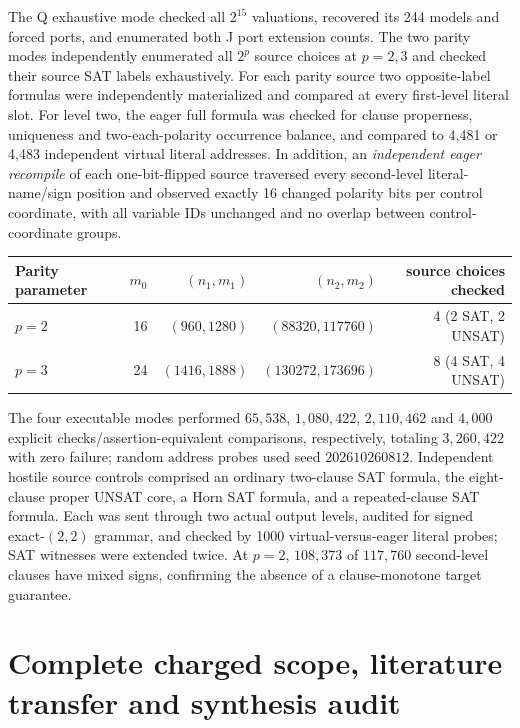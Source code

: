 \documentclass[11pt]{article}
\begin{document}
The Q exhaustive mode checked all $2^{15}$ valuations, recovered its 244 models and forced ports, and enumerated both J port extension counts. The two parity modes independently enumerated all $2^p$ source choices at $p=2,3$ and checked their source SAT labels exhaustively. For each parity source two opposite-label formulas were independently materialized and compared at every first-level literal slot. For level two, the eager full formula was checked for clause properness, uniqueness and two-each-polarity occurrence balance, and compared to 4,481 or 4,483 independent virtual literal addresses. In addition, an \emph{independent eager recompile} of each one-bit-flipped source traversed every second-level literal-name/sign position and observed exactly 16 changed polarity bits per control coordinate, with all variable IDs unchanged and no overlap between control-coordinate groups.

\begin{center}\small
\begin{tabular}{lrrrr}
\toprule
Parity parameter & $m_0$ & $(n_1,m_1)$ & $(n_2,m_2)$ & source choices checked\\\midrule
$p=2$ &16&$(960,1280)$&$(88320,117760)$&4 (2 SAT, 2 UNSAT)\\
$p=3$ &24&$(1416,1888)$&$(130272,173696)$&8 (4 SAT, 4 UNSAT)\\\bottomrule
\end{tabular}
\end{center}
The four executable modes performed $65{,}538$, $1{,}080{,}422$, $2{,}110{,}462$ and $4{,}000$ explicit checks/assertion-equivalent comparisons, respectively, totaling $3{,}260{,}422$ with zero failure; random address probes used seed $202610260812$. Independent hostile source controls comprised an ordinary two-clause SAT formula, the eight-clause proper UNSAT core, a Horn SAT formula, and a repeated-clause SAT formula. Each was sent through two actual output levels, audited for signed exact-$(2,2)$ grammar, and checked by 1000 virtual-versus-eager literal probes; SAT witnesses were extended twice. At $p=2$, $108{,}373$ of $117{,}760$ second-level clauses have mixed signs, confirming the absence of a clause-monotone target guarantee.

\section{Complete charged scope, literature transfer and synthesis audit}
\end{document}
